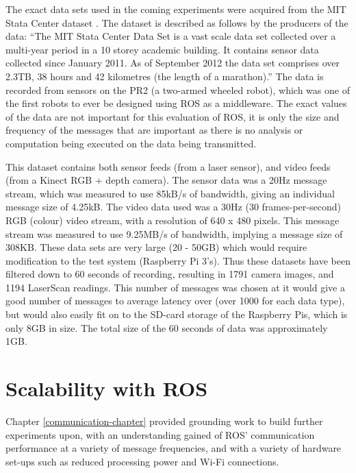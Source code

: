 \documentclass{l4proj}
\begin{document}
The exact data sets used in the coming experiments were acquired from the MIT Stata Center dataset \cite{mit-stata-center-dataset}. The dataset is described as follows by the producers of the data: ``The MIT Stata Center Data Set is a vast scale data set collected over a multi-year period in a 10 storey academic building. It contains sensor data collected since January 2011. As of September 2012 the data set comprises over 2.3TB, 38 hours and 42 kilometres (the length of a marathon).''\cite{mit-stata-center-dataset} The data is recorded from sensors on the PR2 (a two-armed wheeled robot), which was one of the first robots to ever be designed using ROS as a middleware. The exact values of the data are not important for this evaluation of ROS, it is only the size and frequency of the messages that are important as there is no analysis or computation being executed on the data being transmitted.

This dataset contains both sensor feeds (from a laser sensor), and video feeds (from a Kinect RGB + depth camera). The sensor data was a 20Hz message stream, which was measured to use 85kB/s of bandwidth, giving an individual message size of 4.25kB. The video data used was a 30Hz (30 frames-per-second) RGB (colour) video stream, with a resolution of 640 x 480 pixels. This message stream was measured to use 9.25MB/s of bandwidth, implying a message size of 308KB. These data sets are very large (20 - 50GB) which would require modification to the test system (Raspberry Pi 3’s). Thus these datasets have been filtered down to 60 seconds of recording, resulting in 1791 camera images, and 1194 LaserScan readings. This number of messages was chosen at it would give a good number of messages to average latency over (over 1000 for each data type), but would also easily fit on to the SD-card storage of the Raspberry Pis, which is only 8GB in size. The total size of the 60 seconds of data was approximately 1GB.





\chapter{Scalability with ROS}
\label{host-scalability-chapter}

Chapter \ref{communication-chapter} provided grounding work to build further experiments upon, with an understanding gained of ROS' communication performance at a variety of message frequencies, and with a variety of hardware set-ups such as reduced processing power and Wi-Fi connections.
\end{document}
